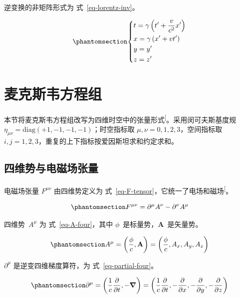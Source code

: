 \documentclass[
  chinese,
  a4paper,
  UTF8,
  12pt,
  oneside,
  openany]{ctexbook}
\theoremstyle{plain}
\theoremstyle{plain}
\theoremstyle{plain}
\theoremstyle{definition}
\theoremstyle{plain}
\theoremstyle{plain}
\theoremstyle{remark}
\begin{document}
逆变换的非矩阵形式为 式~\ref{eq-lorentz-inv}。

\begin{equation}\protect\phantomsection\label{eq-lorentz-inv}{
\left\{\begin{aligned}
  & t = \gamma\left(t' + \frac{v}{c^{2}}x' \right) \\
  & x = \gamma\left(x' + vt' \right) \\
  & y = y' \\
  & z = z'
 \end{aligned} \right.
}\end{equation}

\section{麦克斯韦方程组}\label{ux9ea6ux514bux65afux97e6ux65b9ux7a0bux7ec4}

本节将麦克斯韦方程组改写为四维时空中的张量形式\textsuperscript{{[}\citeproc{ref-landaulifshitz1975}{4}{]}}。采用闵可夫斯基度规
\(\eta_{\mu\nu} = \mathrm{diag}(+1,-1,-1,-1)\)；时空指标取
\(\mu,\nu = 0,1,2,3\)，空间指标取
\(i,j = 1,2,3\)，重复的上下指标按爱因斯坦求和约定求和。

\subsection{四维势与电磁场张量}\label{ux56dbux7ef4ux52bfux4e0eux7535ux78c1ux573aux5f20ux91cf}

电磁场张量 \(F^{\mu\nu}\) 由四维势定义为
式~\ref{eq-F-tensor}，它统一了电场和磁场\textsuperscript{{[}\citeproc{ref-jackson1999}{5}{]}}。

\begin{equation}\protect\phantomsection\label{eq-F-tensor}{
F^{\mu\nu} = \partial^{\mu}A^{\nu} - \partial^{\nu}A^{\mu}
}\end{equation}

四维势~\(A^{\mu}\) 为 式~\ref{eq-A-four}，其中
\(\phi\)~是标量势，\(\mathbf{A}\)~是矢量势。

\begin{equation}\protect\phantomsection\label{eq-A-four}{
A^{\mu} = \left(\frac{\phi}{c},\mathbf{A} \right) = \left(\frac{\phi}{c}, A_{x}, A_{y}, A_{z} \right)
}\end{equation}

\(\partial^{\mu}\) 是逆变四维梯度算符，为 式~\ref{eq-partial-four}。

\begin{equation}\protect\phantomsection\label{eq-partial-four}{
\partial^{\mu} = \left(\frac{1}{c}\frac{\partial}{\partial t}, - \boldsymbol{\nabla} \right) = \left(\frac{1}{c}\frac{\partial}{\partial t}, - \frac{\partial}{\partial x}, - \frac{\partial}{\partial y}, - \frac{\partial}{\partial z} \right)
}\end{equation}
\end{document}
